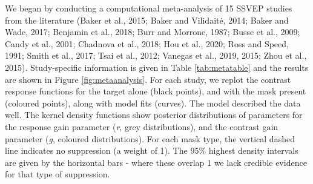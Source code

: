 \documentclass[]{article}
\begin{document}
We began by conducting a computational meta-analysis of 15 SSVEP studies from the literature (Baker et al., 2015; Baker and Vilidaitė, 2014; Baker and Wade, 2017; Benjamin et al., 2018; Burr and Morrone, 1987; Busse et al., 2009; Candy et al., 2001; Chadnova et al., 2018; Hou et al., 2020; Ross and Speed, 1991; Smith et al., 2017; Tsai et al., 2012; Vanegas et al., 2019, 2015; Zhou et al., 2015). Study-specific information is given in Table \ref{tab:metatable} and the results are shown in Figure \ref{fig:metaanalysis}. For each study, we replot the contrast response functions for the target alone (black points), and with the mask present (coloured points), along with model fits (curves). The model described the data well. The kernel density functions show posterior distributions of parameters for the response gain parameter (\emph{r}, grey distributions), and the contrast gain parameter (\emph{g}, coloured distributions). For each mask type, the vertical dashed line indicates no suppression (a weight of 1). The 95\% highest density intervals are given by the horizontal bars - where these overlap 1 we lack credible evidence for that type of suppression.
\end{document}
